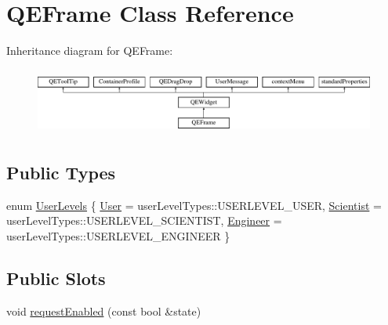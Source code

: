 \hypertarget{classQEFrame}{
\section{QEFrame Class Reference}
\label{classQEFrame}
}
Inheritance diagram for QEFrame:\begin{figure}[H]
\begin{center}
\leavevmode
\includegraphics[height=2.204725cm]{classQEFrame}
\end{center}
\end{figure}
\subsection*{Public Types}
\begin{DoxyCompactItemize}
\item 
enum \hyperlink{classQEFrame_a7f512f888a2a6f46631a382597090503}{UserLevels} \{ \hyperlink{classQEFrame_a7f512f888a2a6f46631a382597090503ae8ace5cdce21b461961fe91d9e866e08}{User} =  userLevelTypes::USERLEVEL\_\-USER, 
\hyperlink{classQEFrame_a7f512f888a2a6f46631a382597090503a9c26f1c5e07f37944ee8995df369486f}{Scientist} =  userLevelTypes::USERLEVEL\_\-SCIENTIST, 
\hyperlink{classQEFrame_a7f512f888a2a6f46631a382597090503ac51282f02e7904d94e142f51c92e3a33}{Engineer} =  userLevelTypes::USERLEVEL\_\-ENGINEER
 \}
\end{DoxyCompactItemize}
\subsection*{Public Slots}
\begin{DoxyCompactItemize}
\item 
void \hyperlink{classQEFrame_a13bfd1a9f001b309575897750d992988}{requestEnabled} (const bool \&state)
\end{DoxyCompactItemize}
